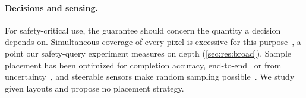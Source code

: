 \paragraph{Decisions and sensing.}
For safety-critical use, the guarantee should concern the quantity a decision depends on.
Simultaneous coverage of every pixel is excessive for this purpose~\cite{lekeufack2024cdt}, a point our safety-query experiment measures on depth (\cref{sec:res:broad}).
Sample placement has been optimized for completion accuracy, end-to-end~\cite{bergman2020adaptivelidar} or from uncertainty~\cite{taguchi2023interactive}, and steerable sensors make random sampling possible~\cite{pittaluga2020mems}.
We study given layouts and propose no placement strategy.
